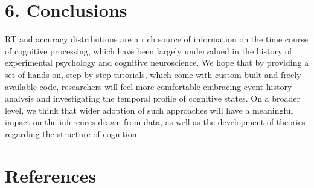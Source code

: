 \documentclass[
  man,floatsintext]{apa6}
\begin{document}
\section{6. Conclusions}\label{conclusions}

RT and accuracy distributions are a rich source of information on the time course of cognitive processing, which have been largely undervalued in the history of experimental psychology and cognitive neuroscience. We hope that by providing a set of hands-on, step-by-step tutorials, which come with custom-built and freely available code, researchers will feel more comfortable embracing event history analysis and investigating the temporal profile of cognitive states. On a broader level, we think that wider adoption of such approaches will have a meaningful impact on the inferences drawn from data, as well as the development of theories regarding the structure of cognition.

\newpage

\section{References}\label{references}
\end{document}
